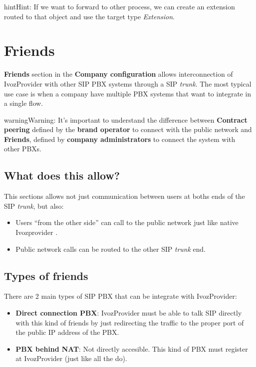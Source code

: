\documentclass[letterpaper,10pt,english]{sphinxmanual}
\begin{document}
\begin{notice}{hint}{Hint:}
If we want to forward to other process, we can create an extension
routed to that object and use the target type \emph{Extension}.
\end{notice}


\section{Friends}
\label{pbx_features/friends:friends}\label{pbx_features/friends::doc}
\textbf{Friends} section in the \textbf{Company configuration} allows interconnection of
IvozProvider with other SIP PBX systems through a SIP \emph{trunk}. The most typical
use case is when a company have multiple PBX systems that want to integrate in
a single flow.

\begin{notice}{warning}{Warning:}
It's important to understand the difference between \textbf{Contract peering}
defined by the \textbf{brand operator} to connect with the public network
and \textbf{Friends}, defined by \textbf{company administrators} to connect the
system with other PBXs.
\end{notice}


\subsection{What does this allow?}
\label{pbx_features/friends:what-does-this-allow}
This sections allows not just communication between users at boths ends of the
SIP \emph{trunk}, but also:
\begin{itemize}
\item {} 
Users ``from the other side'' can call to the public network just like native
Ivozprovider {\hyperref[pbx_features/users:users]{}}.

\item {} 
Public network calls can be routed to the other SIP \emph{trunk} end.

\end{itemize}


\subsection{Types of friends}
\label{pbx_features/friends:types-of-friends}
There are 2 main types of SIP PBX that can be integrate with IvozProvider:
\begin{itemize}
\item {} 
\textbf{Direct connection PBX}: IvozProvider must be able to talk SIP directly with
this kind of friends by just redirecting the traffic to the proper port of
the public IP address of the PBX.

\item {} 
\textbf{PBX behind NAT}: Not directly accesible. This kind of PBX must register at
IvozProvider (just like all the {\hyperref[pbx_features/terminals:terminals]{}} do).

\end{itemize}
\end{document}
